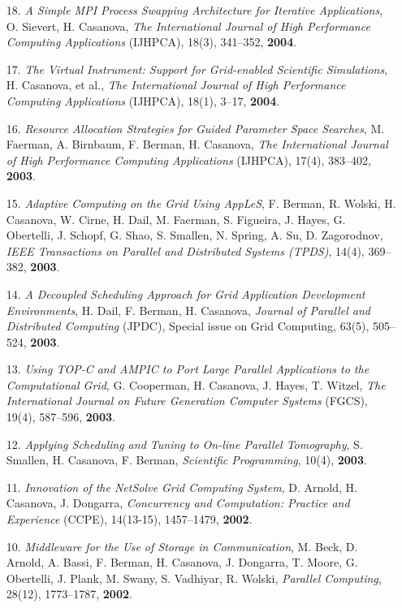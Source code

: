 \begin{enumerate}
\item [18.]
{\it A Simple MPI Process Swapping Architecture for Iterative
Applications}, O. Sievert, H. Casanova, \emph{The International Journal
of High Performance Computing Applications} (IJHPCA), 18(3),  341--352,
{\bf 2004}.

\item [17.]
{\it The Virtual Instrument: Support for Grid-enabled Scientific
Simulations}, H. Casanova, et al., \emph{The International Journal of High
Performance Computing Applications} (IJHPCA), 18(1), 3--17, {\bf 2004}.

\item [16.] 
{\it Resource Allocation Strategies for Guided Parameter Space Searches},
M. Faerman, A. Birnbaum, F. Berman, H. Casanova, \emph{The International
Journal of High Performance Computing Applications} (IJHPCA), 
17(4),  383--402, {\bf 2003}.

\item [15.]
{\it Adaptive Computing on the Grid Using AppLeS}, F. Berman, R. Wolski,
H. Casanova, W. Cirne, H. Dail, M. Faerman, S. Figueira, J. Hayes,
G. Obertelli, J. Schopf, G. Shao, S. Smallen, N. Spring, A. Su,
D. Zagorodnov, \emph{IEEE Transactions on Parallel and Distributed
Systems (TPDS)}, 14(4), 369--382, {\bf 2003}.

\item [14.]
{\it A Decoupled Scheduling Approach for Grid Application Development
Environments}, H. Dail, F. Berman, H. Casanova, \emph{Journal of Parallel
and Distributed Computing} (JPDC), Special issue on Grid Computing,
63(5), 505--524, {\bf 2003}.

\item[13.]
{\it Using TOP-C and AMPIC to Port Large Parallel Applications to the
Computational Grid}, G. Cooperman, H. Casanova, J. Hayes, T. Witzel,
\emph{The International Journal on Future Generation Computer Systems}
(FGCS), 19(4), 587--596, {\bf 2003}.  

\item[12.]
{\it Applying Scheduling and Tuning to On-line Parallel Tomography},
S. Smallen, H. Casanova, F. Berman, \emph{Scientific Programming},
10(4), {\bf 2003}. 

\item[11.]
{\it Innovation of the NetSolve Grid Computing System}, D. Arnold,
H. Casanova, J. Dongarra, \emph{Concurrency and Computation: Practice
and Experience} (CCPE), 14(13-15), 1457--1479, {\bf 2002}. 

\item[10.]
{\it Middleware for the Use of Storage in Communication}, M. Beck,
D. Arnold, A. Bassi, F. Berman, H. Casanova, J. Dongarra, T. Moore,
G. Obertelli, J. Plank, M. Swany, S. Vadhiyar, R. Wolski, \emph{Parallel
Computing}, 28(12), 1773--1787, {\bf 2002}.


\end{enumerate}
